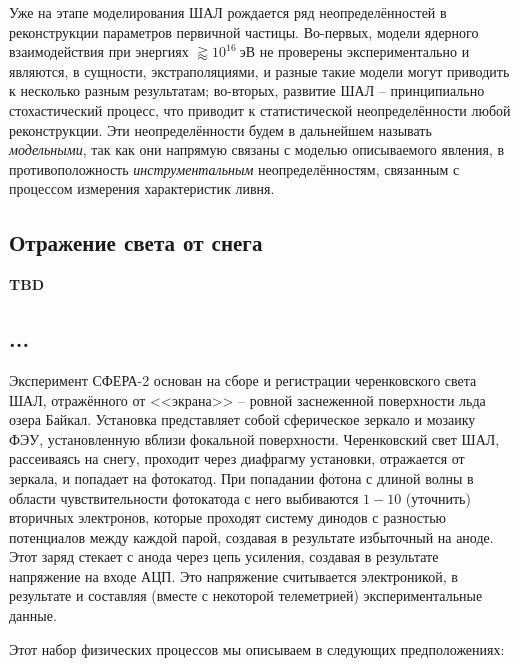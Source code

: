 \documentclass[12pt]{book}
\begin{document}
	Уже на этапе моделирования ШАЛ рождается ряд неопределённостей в реконструкции параметров первичной частицы. Во-первых, модели ядерного взаимодействия при энергиях $\gtrapprox 10^{16}~\text{эВ}$ не проверены экспериментально и являются, в сущности, экстраполяциями, и разные такие модели могут приводить к несколько разным результатам; во-вторых, развитие ШАЛ -- принципиально стохастический процесс, что приводит к статистической неопределённости любой реконструкции. Эти неопределённости будем в дальнейшем называть \textit{модельными}, так как они напрямую связаны с моделью описываемого явления, в противоположность \textit{инструментальным} неопределённостям, связанным с процессом измерения характеристик ливня.
	
	\subsection{Отражение света от снега}
	
	\textbf{TBD}
	
	\subsection{...}

	Эксперимент СФЕРА-2 основан на сборе и регистрации черенковского света ШАЛ, отражённого от <<экрана>> -- ровной заснеженной поверхности льда озера Байкал. Установка представляет собой сферическое зеркало и мозаику ФЭУ, установленную вблизи фокальной поверхности. Черенковский свет ШАЛ, рассеиваясь на снегу, проходит через диафрагму установки, отражается от зеркала, и попадает на фотокатод. При попадании фотона с длиной волны в области чувствительности фотокатода с него выбиваются $1 - 10$ (уточнить) вторичных электронов, которые проходят систему динодов с разностью потенциалов между каждой парой, создавая в результате избыточный на аноде. Этот заряд стекает с анода через цепь усиления, создавая в результате напряжение на входе АЦП. Это напряжение считывается электроникой, в результате и составляя (вместе с некоторой телеметрией) экспериментальные данные.
	
	Этот набор физических процессов мы описываем в следующих предположениях:
	
\end{document}
